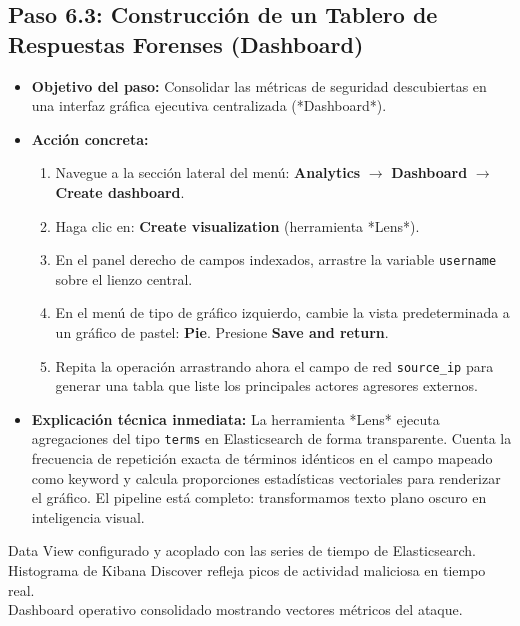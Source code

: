 \documentclass[
  coursetitle={Cómputo Nube y Tecnologías Emergentes},
  coursehours={96},
  coursedate={Verano 2026},
  doctype={Guía de Laboratorio Práctico},
  otherlangs={english,french},
  authorname={Lázaro},
  authorsurname={Bustio-Martínez},
  authortitle={PhD},
  role={Profesor Investigador},
  email={lbustio@inaoe.mx},
  phone={5559504000},
  ext={7459},
  institution={Instituto Nacional de Astrofísica, Óptica y Electrónica (INAOE)},
  department={Maestría en Ciencias en Tecnologías de Seguridad},
  address={Luis Enrique Erro 1, Sta. Ma. Tonantzintla, San Andrés Cholula, CP 72840, Puebla, México},
  margin={0.5in}
]{../../lbustio_lecture_notes}
\begin{document}
\subsection{Paso 6.3: Construcción de un Tablero de Respuestas Forenses (Dashboard)}
\begin{itemize}
    \item \textbf{Objetivo del paso:} Consolidar las métricas de seguridad descubiertas en una interfaz gráfica ejecutiva centralizada (*Dashboard*).
    \item \textbf{Acción concreta:}
    \begin{enumerate}
        \item Navegue a la sección lateral del menú: \textbf{Analytics} $\rightarrow$ \textbf{Dashboard} $\rightarrow$ \textbf{Create dashboard}.
        \item Haga clic en: \textbf{Create visualization} (herramienta *Lens*).
        \item En el panel derecho de campos indexados, arrastre la variable \texttt{username} sobre el lienzo central.
        \item En el menú de tipo de gráfico izquierdo, cambie la vista predeterminada a un gráfico de pastel: \textbf{Pie}. Presione \textbf{Save and return}.
        \item Repita la operación arrastrando ahora el campo de red \texttt{source\_ip} para generar una tabla que liste los principales actores agresores externos.
    \end{enumerate}

    \item \textbf{Explicación técnica inmediata:} La herramienta *Lens* ejecuta agregaciones del tipo \texttt{terms} en Elasticsearch de forma transparente. Cuenta la frecuencia de repetición exacta de términos idénticos en el campo mapeado como keyword y calcula proporciones estadísticas vectoriales para renderizar el gráfico. El pipeline está completo: transformamos texto plano oscuro en inteligencia visual.
\end{itemize}

\begin{tcolorbox}[colback=green!5!white,colframe=green!60!black,title=\textbf{Checkpoint de Validación Final}]
\checkmark Data View configurado y acoplado con las series de tiempo de Elasticsearch.\\
\checkmark Histograma de Kibana Discover refleja picos de actividad maliciosa en tiempo real.\\
\checkmark Dashboard operativo consolidado mostrando vectores métricos del ataque.
\end{tcolorbox}
\end{document}
